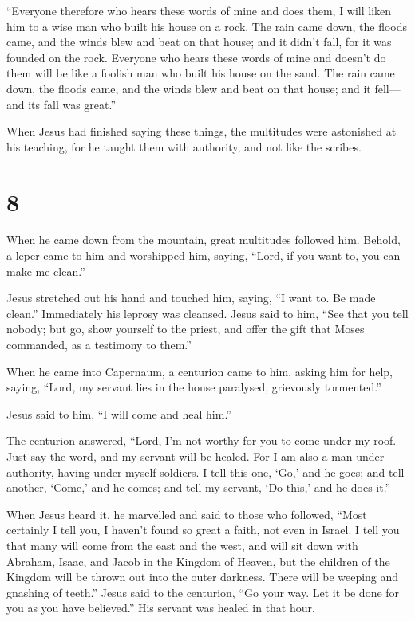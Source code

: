  ``Everyone therefore who hears these words of mine and
does them, I will liken him to a wise man who built his house on a rock.
 The rain came down, the floods came, and the winds blew
and beat on that house; and it didn't fall, for it was founded on the
rock.  Everyone who hears these words of mine and doesn't
do them will be like a foolish man who built his house on the sand.
 The rain came down, the floods came, and the winds blew
and beat on that house; and it fell---and its fall was great.''

 When Jesus had finished saying these things, the
multitudes were astonished at his teaching,  for he taught
them with authority, and not like the scribes.

\hypertarget{section-7}{%
\section{8}\label{section-7}}

 When he came down from the mountain, great multitudes
followed him.  Behold, a leper came to him and worshipped
him, saying, ``Lord, if you want to, you can make me clean.''

 Jesus stretched out his hand and touched him, saying, ``I
want to. Be made clean.'' Immediately his leprosy was cleansed.
 Jesus said to him, ``See that you tell nobody; but go, show
yourself to the priest, and offer the gift that Moses commanded, as a
testimony to them.''

 When he came into Capernaum, a centurion came to him,
asking him for help,  saying, ``Lord, my servant lies in the
house paralysed, grievously tormented.''

 Jesus said to him, ``I will come and heal him.''

 The centurion answered, ``Lord, I'm not worthy for you to
come under my roof. Just say the word, and my servant will be healed.
 For I am also a man under authority, having under myself
soldiers. I tell this one, `Go,' and he goes; and tell another, `Come,'
and he comes; and tell my servant, `Do this,' and he does it.''

 When Jesus heard it, he marvelled and said to those who
followed, ``Most certainly I tell you, I haven't found so great a faith,
not even in Israel.  I tell you that many will come from
the east and the west, and will sit down with Abraham, Isaac, and Jacob
in the Kingdom of Heaven,  but the children of the Kingdom
will be thrown out into the outer darkness. There will be weeping and
gnashing of teeth.''  Jesus said to the centurion, ``Go
your way. Let it be done for you as you have believed.'' His servant was
healed in that hour.

